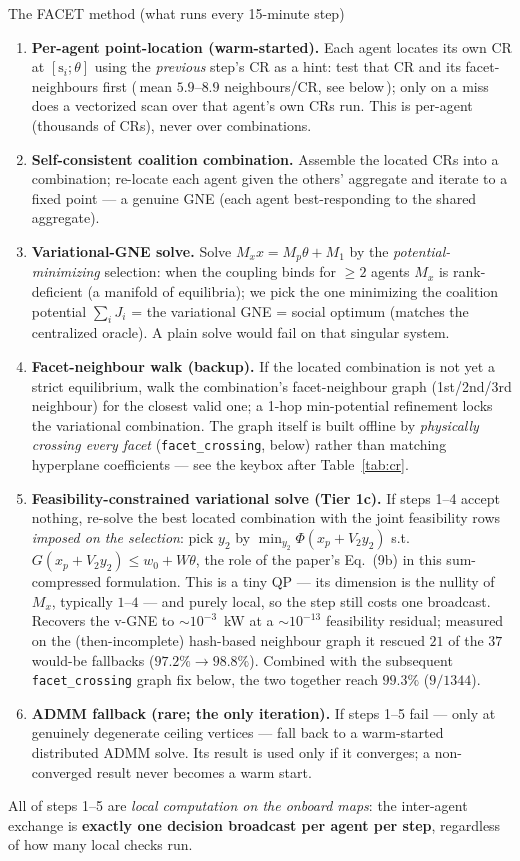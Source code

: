 \documentclass[11pt, letterpaper]{article}
\begin{document}
\begin{keybox}{The FACET method (what runs every 15-minute step)}
\begin{enumerate}[leftmargin=1.6em,nosep]
\item \textbf{Per-agent point-location (warm-started).} Each agent locates its own CR at
$[\mathrm{s}_i;\theta]$ using the \emph{previous} step's CR as a hint: test that CR and its
facet-neighbours first (\,mean $5.9$--$8.9$ neighbours/CR, see below\,); only on a miss does a
vectorized scan over that agent's own CRs run. This is per-agent (thousands of CRs), never over
combinations.
\item \textbf{Self-consistent coalition combination.} Assemble the located CRs into a combination;
re-locate each agent given the others' aggregate and iterate to a fixed point --- a genuine GNE
(each agent best-responding to the shared aggregate).
\item \textbf{Variational-GNE solve.} Solve $M_x x=M_p\theta+M_1$ by the \emph{potential-minimizing}
selection: when the coupling binds for $\ge2$ agents $M_x$ is rank-deficient (a manifold of
equilibria); we pick the one minimizing the coalition potential $\sum_i J_i$ = the variational GNE =
social optimum (matches the centralized oracle). A plain solve would fail on that singular system.
\item \textbf{Facet-neighbour walk (backup).} If the located combination is not yet a strict
equilibrium, walk the combination's facet-neighbour graph (1st/2nd/3rd neighbour) for the closest
valid one; a 1-hop min-potential refinement locks the variational combination. The graph itself is
built offline by \emph{physically crossing every facet} (\texttt{facet\_crossing}, below) rather than
matching hyperplane coefficients --- see the keybox after Table~\ref{tab:cr}.
\item \textbf{Feasibility-constrained variational solve (Tier 1c).} If steps 1--4 accept nothing,
re-solve the best located combination with the joint feasibility rows \emph{imposed on the
selection}: pick $y_2$ by $\min_{y_2}\Phi(x_p+V_2y_2)$ s.t.\ $G(x_p+V_2y_2)\le w_0+W\theta$, the
role of the paper's Eq.~(9b) in this sum-compressed formulation. This is a tiny QP --- its dimension
is the nullity of $M_x$, typically $1$--$4$ --- and purely local, so the step still costs one
broadcast. Recovers the v-GNE to $\sim\!10^{-3}$~kW at a $\sim\!10^{-13}$ feasibility residual;
measured on the (then-incomplete) hash-based neighbour graph it rescued $21$ of the $37$ would-be
fallbacks ($97.2\%\!\to\!98.8\%$). Combined with the subsequent \texttt{facet\_crossing} graph fix
below, the two together reach $99.3\%$ ($9/1344$).
\item \textbf{ADMM fallback (rare; the only iteration).} If steps 1--5 fail --- only at genuinely
degenerate ceiling vertices --- fall back to a warm-started distributed ADMM solve. Its result is
used only if it converges; a non-converged result never becomes a warm start.
\end{enumerate}
All of steps 1--5 are \emph{local computation on the onboard maps}: the inter-agent exchange is
\textbf{exactly one decision broadcast per agent per step}, regardless of how many local checks run.
\end{keybox}
\end{document}
